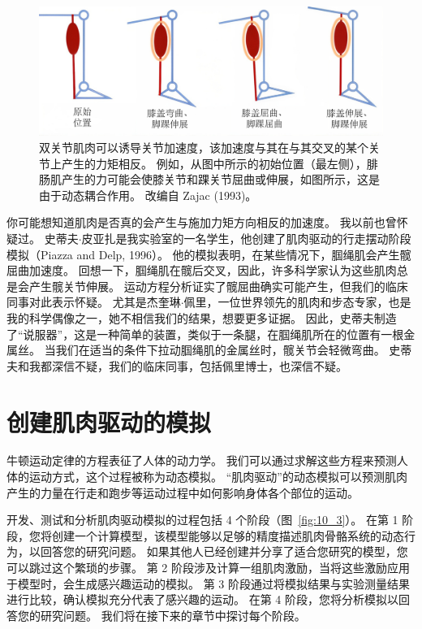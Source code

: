 \begin{figure}[!htb]
	\centering
	\includegraphics[width=0.75\linewidth]{chap10/10_2}
	\caption{双关节肌肉可以诱导关节加速度，该加速度与其在与其交叉的某个关节上产生的力矩相反。
		例如，从图中所示的初始位置（最左侧），腓肠肌产生的力可能会使膝关节和踝关节屈曲或伸展，如图所示，这是由于动态耦合作用。
		改编自 Zajac (1993)。 \label{fig:10_2}}
\end{figure}


你可能想知道肌肉是否真的会产生与施加力矩方向相反的加速度。
我以前也曾怀疑过。
史蒂夫$\cdot$皮亚扎是我实验室的一名学生，他创建了肌肉驱动的行走摆动阶段模拟（Piazza and Delp, 1996）。
他的模拟表明，在某些情况下，腘绳肌会产生髋屈曲加速度。
回想一下，腘绳肌在髋后交叉，因此，许多科学家认为这些肌肉总是会产生髋关节伸展。
运动方程分析证实了髋屈曲确实可能产生，但我们的临床同事对此表示怀疑。
尤其是杰奎琳$\cdot$佩里，一位世界领先的肌肉和步态专家，也是我的科学偶像之一，她不相信我们的结果，想要更多证据。
因此，史蒂夫制造了“说服器”，这是一种简单的装置，类似于一条腿，在腘绳肌所在的位置有一根金属丝。
当我们在适当的条件下拉动腘绳肌的金属丝时，髋关节会轻微弯曲。
史蒂夫和我都深信不疑，我们的临床同事，包括佩里博士，也深信不疑。


\section{创建肌肉驱动的模拟}

牛顿运动定律的方程表征了人体的动力学。
我们可以通过求解这些方程来预测人体的运动方式，这个过程被称为动态模拟。
“肌肉驱动”的动态模拟可以预测肌肉产生的力量在行走和跑步等运动过程中如何影响身体各个部位的运动。


开发、测试和分析肌肉驱动模拟的过程包括 4 个阶段（图~\ref{fig:10_3}）。
在第 1 阶段，您将创建一个计算模型，该模型能够以足够的精度描述肌肉骨骼系统的动态行为，以回答您的研究问题。
如果其他人已经创建并分享了适合您研究的模型，您可以跳过这个繁琐的步骤。
第 2 阶段涉及计算一组肌肉激励，当将这些激励应用于模型时，会生成感兴趣运动的模拟。
第 3 阶段通过将模拟结果与实验测量结果进行比较，确认模拟充分代表了感兴趣的运动。
在第 4 阶段，您将分析模拟以回答您的研究问题。
我们将在接下来的章节中探讨每个阶段。


